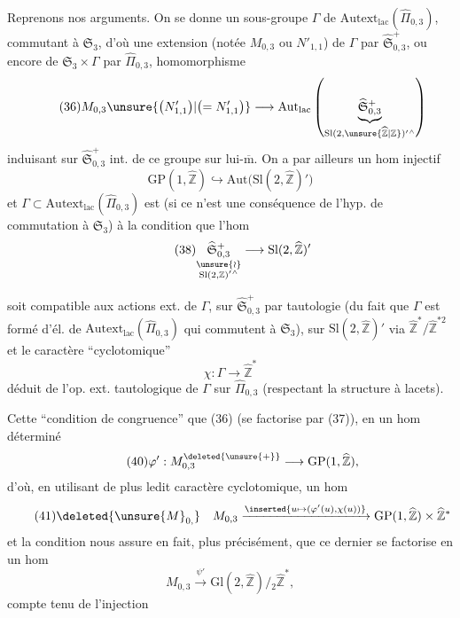 Reprenons nos arguments. On se donne un sous-groupe $\Gamma$ de
$\mathrm{Autext}_{\mathrm{lac}}(\widehat{\Pi}_{0,3})$, commutant à
$\mathfrak S_3$, d'où une extension 
(notée $M_{0,3}$ ou $N'_{1,1}$) de $\Gamma$ par
$\widehat{\mathfrak S}_{0,3}^{+}$, ou encore de
$\mathfrak S_3\times\Gamma$ par $\widehat{\Pi}_{0,3}$,
 homomorphisme
\[
\tag{36}
M_{0,3}\unsure{\bigl(N'_{1,1}\bigr)|\bigl(=N'_{1,1}\bigr)}\longrightarrow
\mathrm{Aut}_{\mathrm{lac}}\left(
\underbrace{\widehat{\mathfrak S}_{0,3}^{+}}_{\mathrm{Sl}(2,\unsure{\widehat{\mathbb Z}|\mathbb Z})'{}^{\wedge}}
\right)
\]
induisant sur $\widehat{\mathfrak S}_{0,3}^{+}$
int. de ce groupe sur lui-$\overline{\mathrm m}$.
On a par ailleurs un hom injectif
\[
\tag{37}
\mathrm{GP}(1,\widehat{\mathbb Z})\hookrightarrow
\mathrm{Aut}\bigl(\mathrm{Sl}(2,\widehat{\mathbb Z})'\bigr)
\]
et $\Gamma\subset\mathrm{Autext}_{\mathrm{lac}}(\widehat{\Pi}_{0,3})$ est
 (si ce n'est  une conséquence de l'hyp. de commutation à
$\mathfrak S_3$) à la condition que l'hom
\[
\tag{38}
\underset{\substack{\unsure{\wr}\\\mathrm{Sl}(2,\mathbb Z)'{}^{\wedge}}}{\widehat{\mathfrak S}_{0,3}^{+}}
\longrightarrow\mathrm{Sl}(2,\widehat{\mathbb Z})'
\]



soit compatible aux actions ext. de $\Gamma$, sur
$\widehat{\mathfrak S}_{0,3}^{+}$ par tautologie (du fait que $\Gamma$ est formé
d'él. de $\mathrm{Autext}_{\mathrm{lac}}(\widehat{\Pi}_{0,3})$ qui commutent à
$\mathfrak S_3$), sur $\mathrm{Sl}(2,\widehat{\mathbb Z})'$ via
$\widehat{\mathbb Z}^{*}/\widehat{\mathbb Z}^{*2}$ et le caractère ``cyclotomique''
\[
\tag{39}
\chi:\Gamma\longrightarrow\widehat{\mathbb Z}^{*}
\]
déduit de l'op. ext. tautologique de $\Gamma$ sur $\widehat{\Pi}_{0,3}$
(respectant la structure à lacets).

Cette ``condition de congruence'' 
  que (36)
(se factorise par (37)), en un hom  déterminé
\[
\tag{40}
\varphi':M_{0,3}^{\deleted{\unsure{+}}}\longrightarrow\mathrm{GP}(1,\widehat{\mathbb Z}),
\]
d'où, en utilisant de plus ledit caractère cyclotomique, un hom
\[
\tag{41}
\deleted{\unsure{M}_{0,}}\quad M_{0,3}
\xrightarrow{\inserted{u\mapsto(\varphi'(u),\chi(u))}}
\mathrm{GP}(1,\widehat{\mathbb Z})\times\widehat{\mathbb Z}^{*}
\]
et la condition  nous assure en fait, plus précisément, que ce dernier
se factorise en un hom
\[
\tag{42}
M_{0,3}\xrightarrow{\psi'}\mathrm{Gl}(2,\widehat{\mathbb Z})/{}_{2}\widehat{\mathbb Z}^{*},
\]
compte tenu de l'injection

